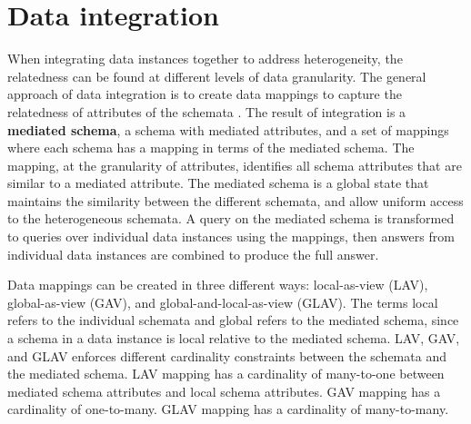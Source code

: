 \section{Data integration}
\label{sec:DataIntegration}

When integrating data instances together to address heterogeneity, the relatedness can be found at different levels of data granularity. The general approach of data integration is to create data mappings to capture the relatedness of attributes of the schemata \cite{Lenzerini2002Data}. The result of integration is a \textbf{\gls{mediated schema}}, a schema with mediated attributes, and a set of mappings where each schema has a mapping in terms of the mediated schema. The mapping, at the granularity of attributes, identifies all schema attributes that are similar to a mediated attribute. The mediated schema is a global state that maintains the similarity between the different schemata, and allow uniform access to the heterogeneous schemata. A query on the mediated schema is transformed to queries over individual data instances using the mappings, then answers from individual data instances are combined to produce the full answer.

Data mappings can be created in three different ways: local-as-view (LAV), global-as-view (GAV), and global-and-local-as-view (GLAV). The terms local refers to the individual schemata and global refers to the mediated schema, since a schema in a data instance is local relative to the mediated schema. LAV, GAV, and GLAV enforces different cardinality constraints between the schemata and the mediated schema. LAV mapping has a cardinality of many-to-one between mediated schema attributes and local schema attributes. GAV mapping has a cardinality of one-to-many. GLAV mapping has a cardinality of many-to-many.

